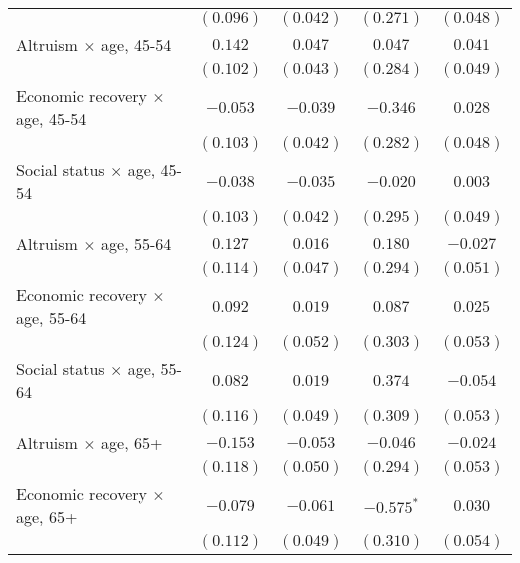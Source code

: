 \begin{table}
\begin{center}
\begin{tabular}{l c c c c}
                                                    & $(0.096)$     & $(0.042)$     & $(0.271)$     & $(0.048)$      \\
Altruism $\times$ age, 45-54                        & $0.142$       & $0.047$       & $0.047$       & $0.041$        \\
                                                    & $(0.102)$     & $(0.043)$     & $(0.284)$     & $(0.049)$      \\
Economic recovery $\times$ age, 45-54               & $-0.053$      & $-0.039$      & $-0.346$      & $0.028$        \\
                                                    & $(0.103)$     & $(0.042)$     & $(0.282)$     & $(0.048)$      \\
Social status $\times$ age, 45-54                   & $-0.038$      & $-0.035$      & $-0.020$      & $0.003$        \\
                                                    & $(0.103)$     & $(0.042)$     & $(0.295)$     & $(0.049)$      \\
Altruism $\times$ age, 55-64                        & $0.127$       & $0.016$       & $0.180$       & $-0.027$       \\
                                                    & $(0.114)$     & $(0.047)$     & $(0.294)$     & $(0.051)$      \\
Economic recovery $\times$ age, 55-64               & $0.092$       & $0.019$       & $0.087$       & $0.025$        \\
                                                    & $(0.124)$     & $(0.052)$     & $(0.303)$     & $(0.053)$      \\
Social status $\times$ age, 55-64                   & $0.082$       & $0.019$       & $0.374$       & $-0.054$       \\
                                                    & $(0.116)$     & $(0.049)$     & $(0.309)$     & $(0.053)$      \\
Altruism $\times$ age, 65+                          & $-0.153$      & $-0.053$      & $-0.046$      & $-0.024$       \\
                                                    & $(0.118)$     & $(0.050)$     & $(0.294)$     & $(0.053)$      \\
Economic recovery $\times$ age, 65+                 & $-0.079$      & $-0.061$      & $-0.575^{*}$  & $0.030$        \\
                                                    & $(0.112)$     & $(0.049)$     & $(0.310)$     & $(0.054)$      \\

\end{tabular}
\end{center}
\end{table}
